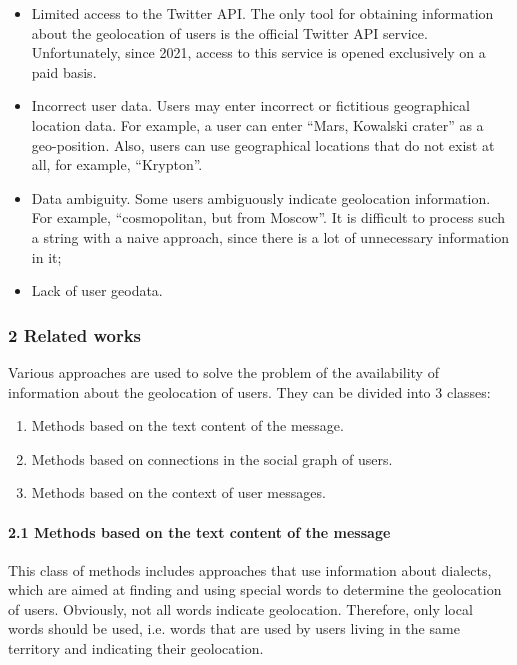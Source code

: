 \begin{itemize}
	\item Limited access to the Twitter API. The only tool for obtaining information about the geolocation of users is the official Twitter API service. Unfortunately, since 2021, access to this service is opened exclusively on a paid basis.
	\item Incorrect user data. Users may enter incorrect or fictitious geographical location data. For example, a user can enter “Mars, Kowalski crater” as a geo-position. Also, users can use geographical locations that do not exist at all, for example, “Krypton”.
	\item Data ambiguity. Some users ambiguously indicate geolocation information. For example, “cosmopolitan, but from Moscow”. It is difficult to process such a string with a naive approach, since there is a lot of unnecessary information in it;
	\item Lack of user geodata.
\end{itemize}

\subsubsection{2 Related works}

Various approaches are used to solve the problem of the availability of information about the geolocation of users. They can be divided into 3 classes:
\begin{enumerate}
	\item Methods based on the text content of the message.
	\item Methods based on connections in the social graph of users.
	\item Methods based on the context of user messages.
\end{enumerate}

\paragraph{2.1 Methods based on the text content of the message} This class of methods includes approaches that use information about dialects, which are aimed at finding and using special words to determine the geolocation of users. Obviously, not all words indicate geolocation. Therefore, only local words should be used, i.e. words that are used by users living in the same territory and indicating their geolocation.


